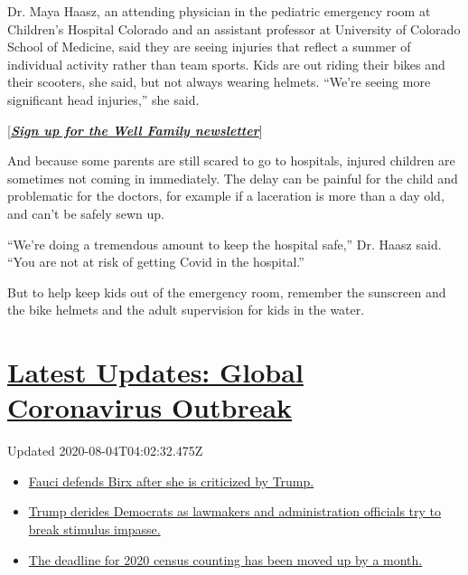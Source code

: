 Dr. Maya Haasz, an attending physician in the pediatric emergency room
at Children's Hospital Colorado and an assistant professor at University
of Colorado School of Medicine, said they are seeing injuries that
reflect a summer of individual activity rather than team sports. Kids
are out riding their bikes and their scooters, she said, but not always
wearing helmets. ``We're seeing more significant head injuries,'' she
said.

{[}\textbf{\href{https://www.nytimes.com/newsletters/well-family}{\emph{Sign
up for the Well Family newsletter}}}{]}

And because some parents are still scared to go to hospitals, injured
children are sometimes not coming in immediately. The delay can be
painful for the child and problematic for the doctors, for example if a
laceration is more than a day old, and can't be safely sewn up.

``We're doing a tremendous amount to keep the hospital safe,'' Dr. Haasz
said. ``You are not at risk of getting Covid in the hospital.''

But to help keep kids out of the emergency room, remember the sunscreen
and the bike helmets and the adult supervision for kids in the water.

\hypertarget{latest-updates-global-coronavirus-outbreak}{%
\section{\texorpdfstring{\href{https://www.nytimes.com/2020/08/03/world/coronavirus-covid-19.html?action=click\&pgtype=Article\&state=default\&region=MAIN_CONTENT_1\&context=storylines_live_updates}{Latest
Updates: Global Coronavirus
Outbreak}}{Latest Updates: Global Coronavirus Outbreak}}\label{latest-updates-global-coronavirus-outbreak}}

Updated 2020-08-04T04:02:32.475Z

\begin{itemize}
\tightlist
\item
  \href{https://www.nytimes.com/2020/08/03/world/coronavirus-covid-19.html?action=click\&pgtype=Article\&state=default\&region=MAIN_CONTENT_1\&context=storylines_live_updates\#link-4547638f}{Fauci
  defends Birx after she is criticized by Trump.}
\item
  \href{https://www.nytimes.com/2020/08/03/world/coronavirus-covid-19.html?action=click\&pgtype=Article\&state=default\&region=MAIN_CONTENT_1\&context=storylines_live_updates\#link-15e7f995}{Trump
  derides Democrats as lawmakers and administration officials try to
  break stimulus impasse.}
\item
  \href{https://www.nytimes.com/2020/08/03/world/coronavirus-covid-19.html?action=click\&pgtype=Article\&state=default\&region=MAIN_CONTENT_1\&context=storylines_live_updates\#link-e5a2cda}{The
  deadline for 2020 census counting has been moved up by a month.}
\end{itemize}

